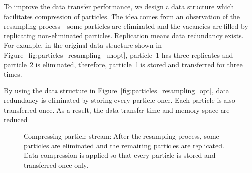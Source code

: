 To improve the data transfer performance, we design a data structure which facilitates compression of particles.
The idea comes from an observation of the resampling process - some particles are eliminated and the vacancies are filled by replicating non-eliminated particles.
Replication means data redundancy exists.
For example, in the original data structure shown in Figure~\ref{fig:particles_resampling_unopt}, 
particle~1 has three replicates and particle~2 is eliminated, therefore, particle~1 is stored and transferred for three times.

By using the data structure in Figure~\ref{fig:particles_resampling_opt}, data redundancy is eliminated by storing every particle once.
Each particle is also transferred once.
As a result, the data transfer time and memory space are reduced.

\setcounter{subfigure}{0}
\begin{figure}[t!]
\centering
{}
\caption{Compressing particle stream: After the resampling process, some particles are eliminated and the remaining particles are replicated. Data compression is applied so that every particle is stored and transferred once only.}
\label{fig:particles_resampling}
\end{figure}

